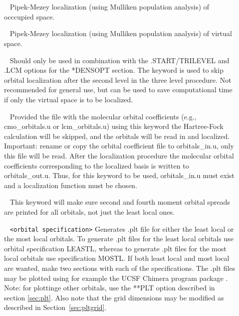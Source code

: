 \begin{description}
\item[]\verb| | \newline
Pipek-Mezey localization (using Mulliken population analysis) of occcupied space.

\item[]\verb| | \newline
Pipek-Mezey localization (using Mulliken population analysis) of virtual space.

\item[]\verb| | \newline
Should only be used in combination with the .START/TRILEVEL and  .LCM options for the *DENSOPT section. The keyword is used to skip orbital localization after the second level in the three level procedure. Not recommended for general use, but can be used to save  computational time if only the virtual space is to be localized.  

\item[]\verb| | \newline
Provided the file with the molecular orbital coefficients (e.g., cmo\_orbitals.u or lcm\_orbitals.u) using this keyword the Hartree-Fock calculation will be skipped, and the orbitals will be read in and localized. Important: rename or copy the orbital coefficient file to orbitals\_in.u, only this file will be read. After the localization procedure the molecular orbital coefficients corresponding to the localized basis is written to orbitals\_out.u. Thus, for this keyword to be used, orbitals\_in.u must exist and a localization function must be chosen.


\item[]\verb| | \newline
This keyword will make sure second and fourth moment orbital spreads are printed for all orbitals, not just the least local ones.


\item[]\verb| | \newline
\verb|<orbital specification>|\newline	
Generates .plt file for either the least local or the most local orbitals. To generate .plt files for the least local orbitals use orbital specification   LEASTL, whereas to generate .plt files for the most local orbitals use specification MOSTL. If both least local and most local are wanted, make two  sections with each of the specifications. The .plt files may be plotted using for example the UCSF Chimera program package \cite{chimera}. Note: for plottinge other orbitals, use the **PLT option described in section \ref{sec:plt}. Also note that the grid dimensions may be modified as described in Section~\ref{sec:pltgrid}.
\end{description}




